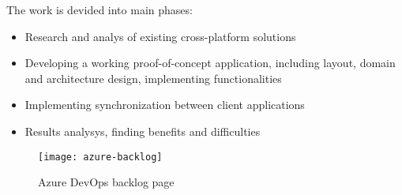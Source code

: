 The work is devided into main phases:

\begin{itemize}
    \item Research and analys of existing cross-platform solutions
    \item Developing a working proof-of-concept application, including layout, domain and architecture design, implementing functionalities
    \item Implementing synchronization between client applications
    \item Results analysys, finding benefits and difficulties
\end{itemize}

\begin{figure}[H]
    \centering
    \texttt{[image: azure-backlog]}
    \caption[Azure DevOps backlog page]{\label{fig:} Azure DevOps backlog page }
\end{figure}